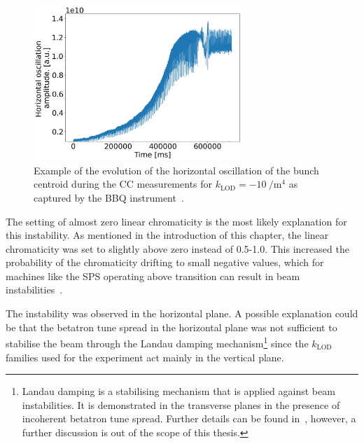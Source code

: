 \begin{figure}[!h]
   \centering         
   \includegraphics[width=0.7\textwidth]{images/Ch8/2022.05.16.17.49.04.430450.png}
       \caption{Example of the evolution of the horizontal oscillation of the bunch centroid during the CC measurements for $k_\mathrm{LOD}=-10 \ \mathrm{/m^4}$ as captured by the BBQ instrument~\cite{Boccardi:1055568}.}
       \label{fig:instability_BBQ_klod-15_4may2022}
\end{figure}


The setting of almost zero linear chromaticity is the most likely explanation for this instability. As mentioned in the introduction of this chapter, the linear chromaticity was set to slightly above zero instead of 0.5-1.0. %
This increased the probability of the chromaticity drifting to small negative values, which for machines like the SPS operating above transition can result in beam instabilities~\cite{collective_effects_cas_li}. %

The instability was observed in the horizontal plane. A possible explanation could be that the betatron tune spread in the horizontal plane was not sufficient to stabilise the beam through the Landau damping mechanism\footnote{Landau damping is a stabilising mechanism that is applied against beam instabilities. It is demonstrated in the transverse planes in the presence of incoherent betatron tune spread. Further details can be found in~\cite{Herr:1982428, Schenk:2665819}, however, a further discussion is out of the scope of this thesis.} since the $k_\mathrm{LOD}$ families used for the experiment act mainly in the vertical plane.


